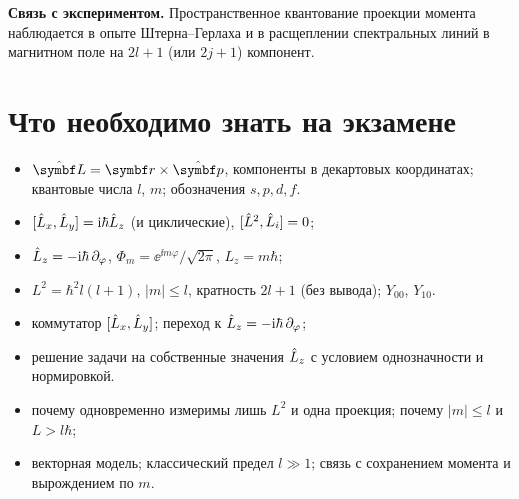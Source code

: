 \textbf{Связь с экспериментом.} Пространственное квантование проекции момента наблюдается в опыте
Штерна--Герлаха и в расщеплении спектральных линий в магнитном поле на $2l+1$ (или $2j+1$) компонент.

\section{Что необходимо знать на экзамене}

\begin{examcheck}
\begin{itemize}
 \item $\op{\vect L}=\vect r\times\op{\vect p}$, компоненты в декартовых координатах; квантовые числа $l$, $m$; обозначения $s,p,d,f$.
\end{itemize}
\begin{itemize}
 \item $[\hat{L}_x,\hat{L}_y]=\mathrm{i}\hbar\hat{L}_z$ (и циклические), $[\hat{L}^2,\hat{L}_i]=0$;
 \item $\hat{L}_z=-\mathrm{i}\hbar\,\partial_\varphi$, $\Phi_m=\ee^{\ii m\varphi}/\sqrt{2\pi}$, $L_z=m\hbar$;
 \item $L^2=\hbar^2l(l+1)$, $|m|\le l$, кратность $2l+1$ (без вывода); $Y_{00}$, $Y_{10}$.
\end{itemize}
\begin{itemize}
 \item коммутатор $[\hat{L}_x,\hat{L}_y]$; переход к $\hat{L}_z=-\mathrm{i}\hbar\,\partial_\varphi$;
 \item решение задачи на собственные значения $\hat{L}_z$ с условием однозначности и нормировкой.
\end{itemize}
\begin{itemize}
 \item почему одновременно измеримы лишь $L^2$ и одна проекция; почему $|m|\le l$ и $L>l\hbar$;
 \item векторная модель; классический предел $l\gg1$; связь с сохранением момента и вырождением по $m$.
\end{itemize}
\end{examcheck}
